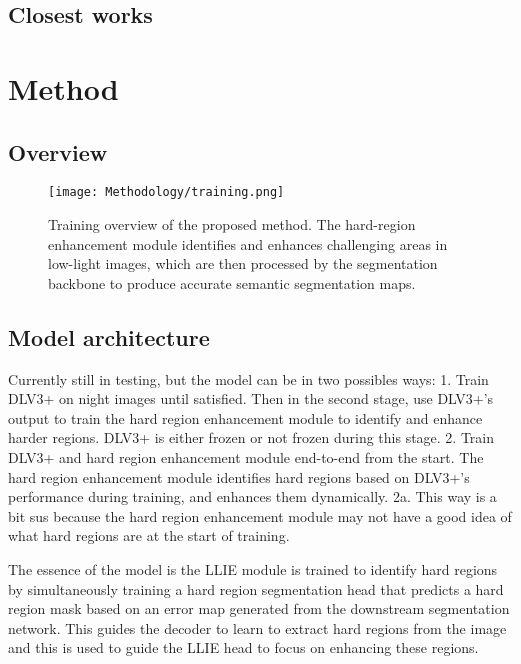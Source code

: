 \documentclass[journal]{IEEEtran}
\begin{document}
\subsection{Closest works}

\section{Method}
\label{sec:method}
\subsection{Overview}
\begin{figure*}[!t]
    \centering
    \texttt{[image: Methodology/training.png]}
    \caption{Training overview of the proposed method. The hard-region enhancement module identifies and enhances challenging areas in low-light images, which are then processed by the segmentation backbone to produce accurate semantic segmentation maps.}
    \label{fig:training_overview}
\end{figure*}

\subsection{Model architecture}

Currently still in testing, but the model can be in two possibles ways:
1. Train DLV3+ on night images until satisfied. Then in the second stage, use DLV3+'s output to train the hard region enhancement module to identify and enhance harder regions. DLV3+ is either frozen or not frozen during this stage.
2. Train DLV3+ and hard region enhancement module end-to-end from the start. The hard region enhancement module identifies hard regions based on DLV3+'s performance during training, and enhances them dynamically.
2a. This way is a bit sus because the hard region enhancement module may not have a good idea of what hard regions are at the start of training.

The essence of the model is the LLIE module is trained to identify hard regions by simultaneously training a hard region segmentation head that predicts a hard region mask based on an error map generated from the downstream segmentation network. This guides the decoder to learn to extract hard regions from the image and this is used to guide the LLIE head to focus on enhancing these regions.

\end{document}

